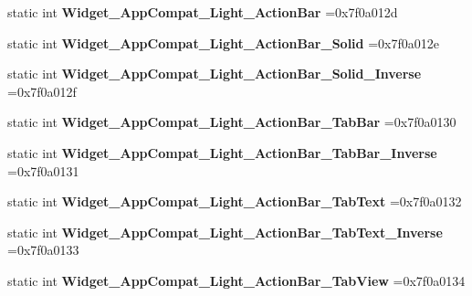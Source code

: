 \begin{DoxyCompactItemize}
static int {\bfseries Widget\+\_\+\+App\+Compat\+\_\+\+Light\+\_\+\+Action\+Bar} =0x7f0a012d
\item 
\mbox{\label{classandroid_1_1support_1_1v7_1_1appcompat_1_1R_1_1style_a477df997216a41dd8d889c225e868f9d}} 
static int {\bfseries Widget\+\_\+\+App\+Compat\+\_\+\+Light\+\_\+\+Action\+Bar\+\_\+\+Solid} =0x7f0a012e
\item 
\mbox{\label{classandroid_1_1support_1_1v7_1_1appcompat_1_1R_1_1style_a05051575fba25d3f976f485392d8e4c7}} 
static int {\bfseries Widget\+\_\+\+App\+Compat\+\_\+\+Light\+\_\+\+Action\+Bar\+\_\+\+Solid\+\_\+\+Inverse} =0x7f0a012f
\item 
\mbox{\label{classandroid_1_1support_1_1v7_1_1appcompat_1_1R_1_1style_a269911870c96c4bd42ac2458f2bb18d3}} 
static int {\bfseries Widget\+\_\+\+App\+Compat\+\_\+\+Light\+\_\+\+Action\+Bar\+\_\+\+Tab\+Bar} =0x7f0a0130
\item 
\mbox{\label{classandroid_1_1support_1_1v7_1_1appcompat_1_1R_1_1style_a0b58a4bf1be3be0c0d637d4dcdd5471b}} 
static int {\bfseries Widget\+\_\+\+App\+Compat\+\_\+\+Light\+\_\+\+Action\+Bar\+\_\+\+Tab\+Bar\+\_\+\+Inverse} =0x7f0a0131
\item 
\mbox{\label{classandroid_1_1support_1_1v7_1_1appcompat_1_1R_1_1style_a7ad0dc212077ba8ec0cc653c6f7e2c8a}} 
static int {\bfseries Widget\+\_\+\+App\+Compat\+\_\+\+Light\+\_\+\+Action\+Bar\+\_\+\+Tab\+Text} =0x7f0a0132
\item 
\mbox{\label{classandroid_1_1support_1_1v7_1_1appcompat_1_1R_1_1style_aa033f995aa8ccb8a3f37009179b667c0}} 
static int {\bfseries Widget\+\_\+\+App\+Compat\+\_\+\+Light\+\_\+\+Action\+Bar\+\_\+\+Tab\+Text\+\_\+\+Inverse} =0x7f0a0133
\item 
\mbox{\label{classandroid_1_1support_1_1v7_1_1appcompat_1_1R_1_1style_a221fd998cdba6cb84f5b011734c3771c}} 
static int {\bfseries Widget\+\_\+\+App\+Compat\+\_\+\+Light\+\_\+\+Action\+Bar\+\_\+\+Tab\+View} =0x7f0a0134

\end{DoxyCompactItemize}
